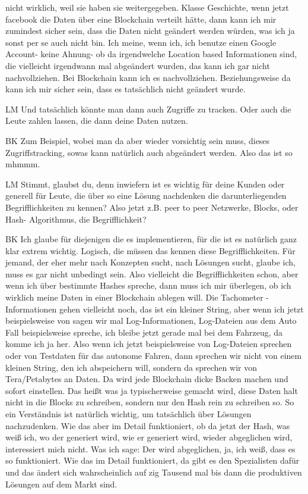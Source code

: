 \begin{xlist}
nicht wirklich, weil sie haben sie weitergegeben. Klasse Geschichte, wenn jetzt facebook die Daten über eine Blockchain verteilt hätte, dann kann ich mir zumindest sicher sein, dass die Daten nicht geändert werden würden, was ich ja sonst per se auch nicht bin. Ich meine, wenn ich, ich benutze einen Google Account- keine Ahnung- ob da irgendwelche Location based Informationen sind, die vielleicht irgendwann mal abgeändert wurden, das kann ich gar nicht nachvollziehen. Bei Blockchain kann ich es nachvollziehen. Beziehungsweise da kann ich mir sicher sein, dass es tatsächlich nicht geändert wurde.
    \item[LM] Und tatsächlich könnte man dann auch Zugriffe zu tracken. Oder auch die Leute zahlen lassen, die dann deine Daten nutzen.
    \item[BK] Zum Beispiel, wobei man da aber wieder vorsichtig sein muss, dieses Zugriffstracking, sowas kann natürlich auch abgeändert werden. Also das ist so mhmmm.
    \item[LM] Stimmt, glaubst du, denn inwiefern ist es wichtig für deine Kunden oder generell für Leute, die über so eine Lösung nachdenken die darunterliegenden Begrifflichkeiten zu kennen? Also jetzt z.B. peer to peer Netzwerke, Blocks, oder Hash- Algorithmus, die Begrifflichkeit?
    \item[BK] Ich glaube für diejenigen die es implementieren, für die ist es natürlich ganz klar extrem wichtig. Logisch, die müssen das kennen diese Begrifflichkeiten. Für jemand, der eher mehr nach Konzepten sucht, nach Lösungen sucht, glaube ich, muss es gar nicht unbedingt sein. Also vielleicht die Begrifflichkeiten schon, aber wenn ich über bestimmte Hashes spreche, dann muss ich mir überlegen, ob ich wirklich meine Daten in einer Blockchain ablegen will. Die Tachometer -Informationen gehen vielleicht noch, das ist ein kleiner String, aber wenn ich jetzt beispielsweise von sagen wir mal Log-Informationen, Log-Dateien aus dem Auto Fall beispielsweise spreche, ich bleibe jetzt gerade mal bei dem Fahrzeug, da komme ich ja her. Also wenn ich jetzt beispielsweise von Log-Dateien sprechen oder von Testdaten für das autonome Fahren, dann sprechen wir nicht von einem kleinen String, den ich abspeichern will, sondern da sprechen wir von Tera/Petabytes an Daten. Da wird jede Blockchain dicke Backen machen und sofort einstellen. Das heißt was ja typischerweise gemacht wird, diese Daten halt nicht in die Blocks zu schreiben, sondern nur den Hash rein zu schreiben so. So ein Verständnis ist natürlich wichtig, um tatsächlich über Lösungen nachzudenken. Wie das aber im Detail funktioniert, ob da jetzt der Hash, was weiß ich, wo der generiert wird, wie er generiert wird, wieder abgeglichen wird, interessiert mich nicht. Was ich sage: Der wird abgeglichen, ja, ich weiß, dass es so funktioniert. Wie das im Detail funktioniert, da gibt es den Spezialisten dafür und das ändert sich wahrscheinlich auf zig Tausend mal bis dann die produktiven Lösungen auf dem Markt sind.

\end{xlist}
